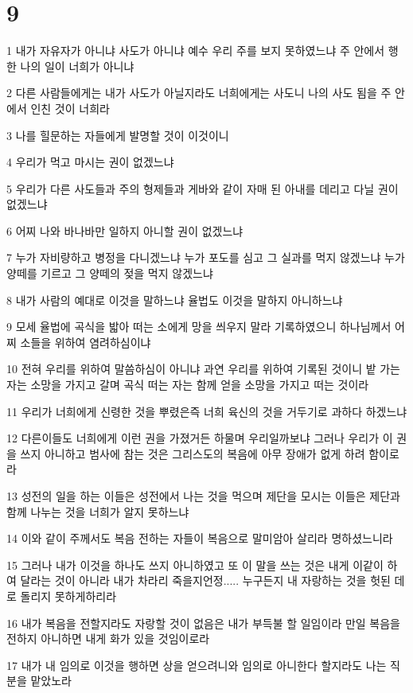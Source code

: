 \chapter{9}

\par 1 내가 자유자가 아니냐 사도가 아니냐 예수 우리 주를 보지 못하였느냐 주 안에서 행한 나의 일이 너희가 아니냐
\par 2 다른 사람들에게는 내가 사도가 아닐지라도 너희에게는 사도니 나의 사도 됨을 주 안에서 인친 것이 너희라
\par 3 나를 힐문하는 자들에게 발명할 것이 이것이니
\par 4 우리가 먹고 마시는 권이 없겠느냐
\par 5 우리가 다른 사도들과 주의 형제들과 게바와 같이 자매 된 아내를 데리고 다닐 권이 없겠느냐
\par 6 어찌 나와 바나바만 일하지 아니할 권이 없겠느냐
\par 7 누가 자비량하고 병정을 다니겠느냐 누가 포도를 심고 그 실과를 먹지 않겠느냐 누가 양떼를 기르고 그 양떼의 젖을 먹지 않겠느냐
\par 8 내가 사람의 예대로 이것을 말하느냐 율법도 이것을 말하지 아니하느냐
\par 9 모세 율법에 곡식을 밟아 떠는 소에게 망을 씌우지 말라 기록하였으니 하나님께서 어찌 소들을 위하여 염려하심이냐
\par 10 전혀 우리를 위하여 말씀하심이 아니냐 과연 우리를 위하여 기록된 것이니 밭 가는 자는 소망을 가지고 갈며 곡식 떠는 자는 함께 얻을 소망을 가지고 떠는 것이라
\par 11 우리가 너희에게 신령한 것을 뿌렸은즉 너희 육신의 것을 거두기로 과하다 하겠느냐
\par 12 다른이들도 너희에게 이런 권을 가졌거든 하물며 우리일까보냐 그러나 우리가 이 권을 쓰지 아니하고 범사에 참는 것은 그리스도의 복음에 아무 장애가 없게 하려 함이로라
\par 13 성전의 일을 하는 이들은 성전에서 나는 것을 먹으며 제단을 모시는 이들은 제단과 함께 나누는 것을 너희가 알지 못하느냐
\par 14 이와 같이 주께서도 복음 전하는 자들이 복음으로 말미암아 살리라 명하셨느니라
\par 15 그러나 내가 이것을 하나도 쓰지 아니하였고 또 이 말을 쓰는 것은 내게 이같이 하여 달라는 것이 아니라 내가 차라리 죽을지언정..... 누구든지 내 자랑하는 것을 헛된 데로 돌리지 못하게하리라
\par 16 내가 복음을 전할지라도 자랑할 것이 없음은 내가 부득불 할 일임이라 만일 복음을 전하지 아니하면 내게 화가 있을 것임이로라
\par 17 내가 내 임의로 이것을 행하면 상을 얻으려니와 임의로 아니한다 할지라도 나는 직분을 맡았노라
